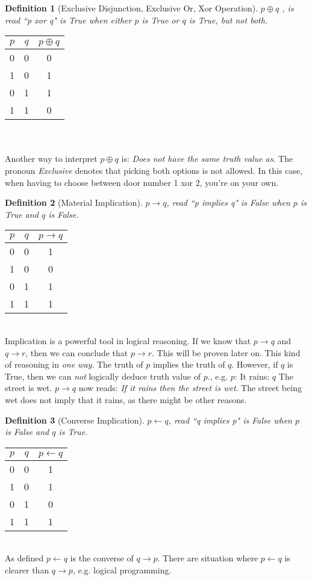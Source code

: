 \documentclass[10pt,a4paper,draft,titlepage,onecolumn]{book}
\newtheorem{definition}{Definition}[subsection]
\begin{document}
\begin{definition}[Exclusive Disjunction, Exclusive Or, Xor Operation] $p{\oplus}q$ , is read \textit{``p xor q"} is True when either $p$ is True or $q$ is True, but not both. \end{definition}
\begin{tabular}{ |c|c|c| }
 \hline
 $p$ & $q$ &  $p{\oplus}q$  \\
 \hline
 0 & 0 & 0 \\
 1 & 0 & 1\\
 0 & 1 & 1\\
 1 & 1 & 0\\
 \hline
\end{tabular}\\\\
Another way to interpret $p{\oplus}q$ is: \textit{Does not have the same truth value as}.
The pronoun \textit{Exclusive} denotes that picking both options is not allowed. In this case, when having to choose between door number 1 xor 2, you're on your own.

\begin{definition}[Material Implication] $p{\rightarrow}q$, read \textit{``p implies q"} is False when $p$ is True and $q$ is False.  
\end{definition} 
\begin{tabular}{ |c|c|c| }
 \hline
 $p$ & $q$ &  $p{\rightarrow}q$  \\
 \hline
 0 & 0 & 1 \\
 1 & 0 & 0 \\
 0 & 1 & 1 \\
 1 & 1 & 1 \\
 \hline
\end{tabular} \\
Implication is a powerful tool in logical reasoning. If we know that $p{\rightarrow}q$ and $q{\rightarrow}r$, then we can conclude that $p{\rightarrow}r$. This will be proven later on. This kind of reasoning in \textit{one way}. The truth of $p$ implies the truth of $q$. However, if $q$ is True, then we can \textit{not} logically deduce truth value of $p$., e.g. $p$: It rains; $q$ The street is wet.  $p{\rightarrow}q$ now reads: \textit{If it rains then the street is wet}.  The street being wet does not imply that it rains, as there might be other reasons.

\begin{definition}[Converse Implication] $p{\leftarrow}q$, read \textit{``q implies p"} is False when $p$ is False and $q$ is True.  
\end{definition}
\begin{tabular}{ |c|c|c| }
 \hline
 $p$ & $q$ &  $p{\leftarrow}q$  \\
 \hline
 0 & 0 & 1 \\
 1 & 0 & 1\\
 0 & 1 & 0\\
 1 & 1 & 1\\
 \hline
\end{tabular}\\
As defined $p{\leftarrow}q$ is the converse of $q{\rightarrow}p$.
There are situation where $p{\leftarrow}q$ is clearer than $q{\rightarrow}p$, e.g. logical programming.
\end{document}
